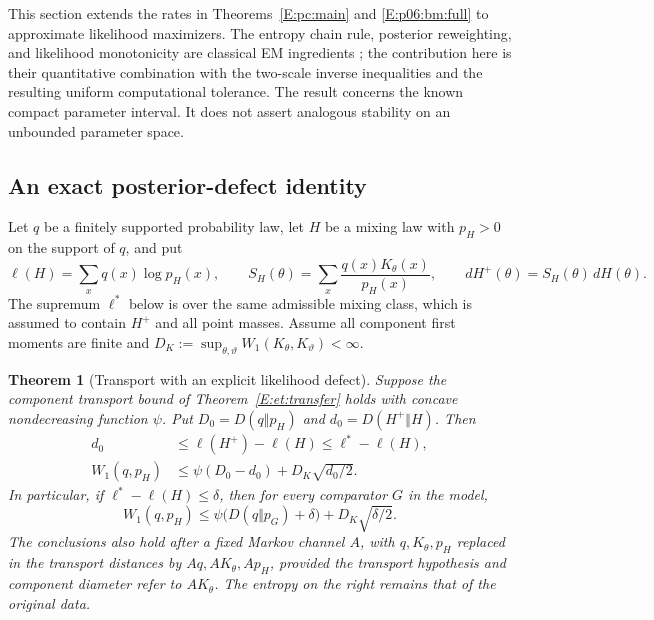 \documentclass[11pt,a4paper]{article}
\newtheorem{theorem}{Theorem}[section]
\theoremstyle{definition}
\theoremstyle{remark}
\numberwithin{equation}{section}
\begin{document}
This section extends the rates in Theorems~\ref{E:pc:main} and
\ref{E:p06:bm:full} to approximate likelihood maximizers. The entropy
chain rule, posterior reweighting, and likelihood monotonicity are
classical EM ingredients \cite{UP_DLR1977}; the contribution here is their quantitative
combination with the two-scale inverse inequalities and the resulting
uniform computational tolerance. The result concerns the known compact
parameter interval. It does not assert analogous stability on an
unbounded parameter space.

\subsection{An exact posterior-defect identity}

Let $q$ be a finitely supported probability law, let $H$ be a mixing
law with $p_H>0$ on the support of $q$, and put
\[
 \ell(H)=\sum_xq(x)\log p_H(x),\qquad
 S_H(\theta)=\sum_x\frac{q(x)K_\theta(x)}{p_H(x)},
 \qquad dH^+(\theta)=S_H(\theta)\,dH(\theta).
\]
The supremum $\ell^*$ below is over the same admissible mixing class,
which is assumed to contain $H^+$ and all point masses. Assume all
component first moments are finite and
$D_K:=\sup_{\theta,\vartheta}W_1(K_\theta,K_\vartheta)<\infty$.

\begin{theorem}[Transport with an explicit likelihood defect]
\label{E:upst:repair}
Suppose the component transport bound of Theorem~\ref{E:et:transfer}
holds with concave nondecreasing function $\psi$. Put
$D_0=D(q\Vert p_H)$ and $d_0=D(H^+\Vert H)$. Then
\begin{align}
 d_0&\le\ell(H^+)-\ell(H)\le\ell^*-\ell(H),
       \label{E:upst:gain}\\
 W_1(q,p_H)&\le\psi(D_0-d_0)+D_K\sqrt{d_0/2}.
       \label{E:upst:repairbound}
\end{align}
In particular, if $\ell^*-\ell(H)\le\delta$, then for every comparator
$G$ in the model,
\begin{equation}\label{E:upst:gapbound}
 W_1(q,p_H)\le
 \psi\bigl(D(q\Vert p_G)+\delta\bigr)+D_K\sqrt{\delta/2}.
\end{equation}
The conclusions also hold after a fixed Markov channel $A$, with
$q,K_\theta,p_H$ replaced in the transport distances by
$Aq,AK_\theta,Ap_H$, provided the transport hypothesis and component
diameter refer to $AK_\theta$. The entropy on the right remains that
of the original data.
\end{theorem}
\end{document}
